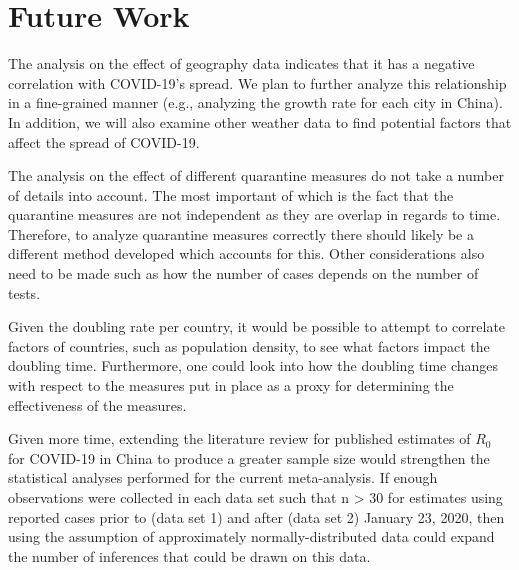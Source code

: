 \documentclass{article}
\begin{document}
\section{Future Work}
The analysis on the effect of geography data indicates that it has a negative correlation with COVID-19's spread. We plan to further analyze this relationship in a fine-grained manner (e.g., analyzing the growth rate for each city in China). In addition, we will also examine other weather data to find potential factors that affect the spread of COVID-19.

The analysis on the effect of different quarantine measures do not take a number of details into account. The most important of which is the fact that the quarantine measures are not independent as they are overlap in regards to time. Therefore, to analyze quarantine
measures correctly there should likely be a different method developed which accounts for this. Other considerations also need to be made such as how the number of cases depends on the number of tests.

Given the doubling rate per country, it would be possible to attempt to correlate factors of countries, such as population density, to see what factors impact the doubling time. 
Furthermore, one could look into how the doubling time changes with respect to the measures put in place as a proxy for determining the effectiveness of the measures.

Given more time, extending the literature review for published estimates of $R_0$ for COVID-19 in China to produce a greater sample size would strengthen the statistical analyses performed for the current meta-analysis. If enough observations were collected in each data set such that n > 30 for estimates using reported cases prior to (data set 1) and after (data set 2) January 23, 2020, then using the assumption of approximately normally-distributed data could expand the number of inferences that could be drawn on this data.
\end{document}
